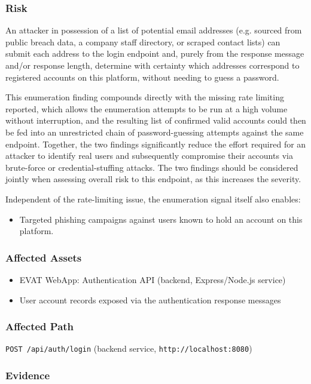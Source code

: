 \documentclass[12pt]{article}
\begin{document}
\subsubsection*{Risk}
An attacker in possession of a list of potential email addresses (e.g. sourced from public breach data, a company staff directory, or scraped contact lists) can submit each address to the login endpoint and, purely from the response message and/or response length, determine with certainty which addresses correspond to registered accounts on this platform, without needing to guess a password.

This enumeration finding compounds directly with the missing rate limiting reported, which allows the enumeration attempts to be run at a high volume without interruption, and the resulting list of confirmed valid accounts could then be fed into an unrestricted chain of password-guessing attempts against the same endpoint. Together, the two findings significantly reduce the effort required for an attacker to identify real users and subsequently compromise their accounts via brute-force or credential-stuffing attacks. The two findings should be considered jointly when assessing overall risk to this endpoint, as this increases the severity.

Independent of the rate-limiting issue, the enumeration signal itself also enables:
\begin{itemize}
    \item Targeted phishing campaigns against users known to hold an account on this platform.
\end{itemize}

\subsubsection*{Affected Assets}
\begin{itemize}
    \item EVAT WebApp: Authentication API (backend, Express/Node.js service)
    \item User account records exposed via the authentication response messages
\end{itemize}

\subsubsection*{Affected Path}
\texttt{POST /api/auth/login} (backend service, \texttt{http://localhost:8080})

\subsubsection*{Evidence}
\end{document}
